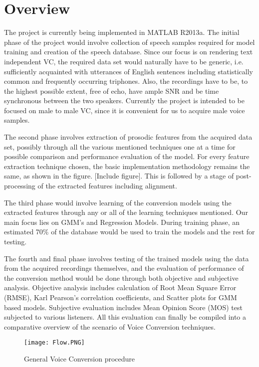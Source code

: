 \documentclass[BTech]{nitkdiss}
\begin{document}
\section{Overview}          

The project is currently being implemented in MATLAB R2013a. The initial phase of the project would involve collection of speech samples required for model training and creation of the speech database. Since our focus is on rendering text independent VC, the required data set would naturally have to be generic, i.e. sufficiently acquainted with utterances of English sentences including statistically common and frequently occurring triphones. Also, the recordings have to be, to the highest possible extent, free of echo, have ample SNR and be time synchronous between the two speakers. Currently the project is intended to be focused on male to male VC, since it is convenient for us to acquire male voice samples.

The second phase involves extraction of prosodic features from the acquired data set, possibly through all the various mentioned techniques one at a time for possible comparison and performance evaluation of the model. For every feature extraction technique chosen, the basic implementation methodology remains the same, as shown in the figure. [Include figure]. This is followed by a stage of post-processing of the extracted features including alignment.

The third phase would involve learning of the conversion models using the extracted features through any or all of the learning techniques mentioned. Our main focus lies on GMM's and Regression Models. During training phase, an estimated 70\% of the database would be used to train the models and the rest for testing.

The fourth and final phase involves testing of the trained models using the data from the acquired recordings themselves, and the evaluation of performance of the conversion method would be done through both objective and subjective analysis. Objective analysis includes calculation of Root Mean Square Error (RMSE), Karl Pearson's correlation coefficients, and Scatter plots for GMM based models. Subjective evaluation includes Mean Opinion Score (MOS) test subjected to various listeners. All this evaluation can finally be compiled into a comparative overview of the scenario of Voice Conversion techniques.

\begin{figure}[H]
\centering
\texttt{[image: Flow.PNG]}
\caption{General Voice Conversion procedure}
\end{figure}
\end{document}
